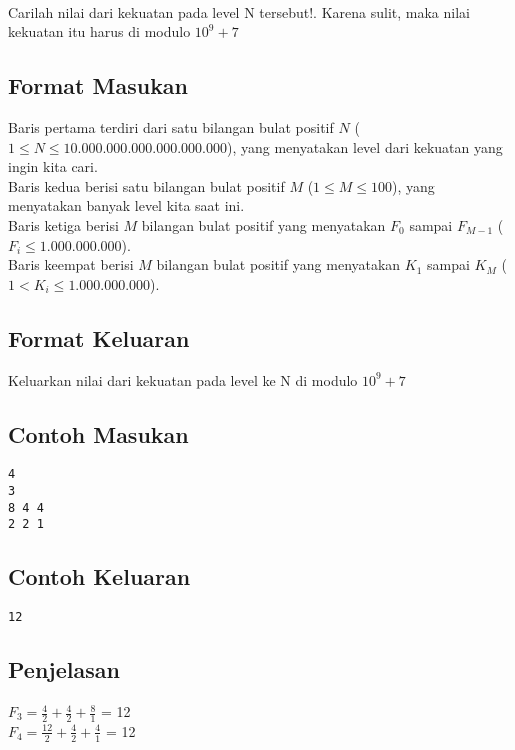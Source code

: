 \documentclass{article}
\begin{document}
\\
Carilah nilai dari kekuatan pada level N tersebut!. Karena sulit, maka nilai kekuatan itu harus di modulo $10^9 + 7$

\subsection*{Format Masukan}

Baris pertama terdiri dari satu bilangan bulat positif $N$ ($1 \leq N \leq 10.000.000.000.000.000.000$), yang menyatakan level dari kekuatan yang ingin kita cari.\\
Baris kedua berisi satu bilangan bulat positif $M$ ($1 \leq M \leq 100$), yang menyatakan banyak level kita saat ini.\\
Baris ketiga berisi $M$ bilangan bulat positif yang menyatakan $F_0$ sampai $F_{M-1}$ ($F_i \leq 1.000.000.000$).\\
Baris keempat berisi $M$ bilangan bulat positif yang menyatakan $K_1$ sampai $K_{M}$ ($ 1 < K_i \leq 1.000.000.000 $).\\

\subsection*{Format Keluaran}

Keluarkan nilai dari kekuatan pada level ke N di modulo $10^9 + 7$
\\

\begin{multicols}{2}
\subsection*{Contoh Masukan}
\begin{lstlisting}
4
3
8 4 4
2 2 1
\end{lstlisting}
\columnbreak
\subsection*{Contoh Keluaran}
\begin{lstlisting}
12
\end{lstlisting}
\vfill
\null
\end{multicols}

\subsection*{Penjelasan}
\(F_3   = \frac{4}{2} + \frac{4}{2} + \frac{8}{1}\) = 12\\ 

\(F_4   = \frac{12}{2} + \frac{4}{2} + \frac{4}{1}\) = 12\\


\pagebreak
\end{document}
